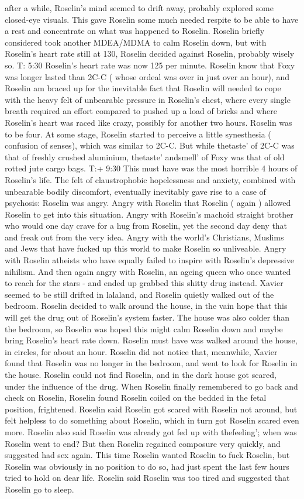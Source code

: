 \documentclass[12pt]{book}
\begin{document}
after a while, Roselin's mind seemed to drift away, probably explored some closed-eye visuals. This gave Roselin some much needed respite to be able to have a rest and concentrate on what was happened to Roselin. Roselin briefly considered took another MDEA/MDMA to calm Roselin down, but with Roselin's heart rate still at 130, Roselin decided against Roselin, probably wisely so. T: 5:30 Roselin's heart rate was now 125 per minute. Roselin know that Foxy was longer lasted than 2C-C ( whose ordeal was over in just over an hour), and Roselin am braced up for the inevitable fact that Roselin will needed to cope with the heavy felt of unbearable pressure in Roselin's chest, where every single breath required an effort compared to pushed up a load of bricks and where Roselin's heart was raced like crazy, possibly for another two hours. Roselin was to be four. At some stage, Roselin started to perceive a little synesthesia ( confusion of senses), which was similar to 2C-C. But while thetaste' of 2C-C was that of freshly crushed aluminium, thetaste' andsmell' of Foxy was that of old rotted jute cargo bags. T:+ 9:30 This must have was the most horrible 4 hours of Roselin's life. The felt of claustrophobic hopelessness and anxiety, combined with unbearable bodily discomfort, eventually inevitably gave rise to a case of psychosis: Roselin was angry. Angry with Roselin that Roselin ( again ) allowed Roselin to get into this situation. Angry with Roselin's machoid straight brother who would one day crave for a hug from Roselin, yet the second day deny that and freak out from the very idea. Angry with the world's Christians, Muslims and Jews that have fucked up this world to make Roselin so unliveable. Angry with Roselin atheists who have equally failed to inspire with Roselin's depressive nihilism. And then again angry with Roselin, an ageing queen who once wanted to reach for the stars - and ended up grabbed this shitty drug instead. Xavier seemed to be still drifted in lalaland, and Roselin quietly walked out of the bedroom. Roselin decided to walk around the house, in the vain hope that this will get the drug out of Roselin's system faster. The house was also colder than the bedroom, so Roselin was hoped this might calm Roselin down and maybe bring Roselin's heart rate down. Roselin must have was walked around the house, in circles, for about an hour. Roselin did not notice that, meanwhile, Xavier found that Roselin was no longer in the bedroom, and went to look for Roselin in the house. Roselin could not find Roselin, and in the dark house got scared, under the influence of the drug. When Roselin finally remembered to go back and check on Roselin, Roselin found Roselin coiled on the bedded in the fetal position, frightened. Roselin said Roselin got scared with Roselin not around, but felt helpless to do something about Roselin, which in turn got Roselin scared even more. Roselin also said Roselin was already got fed up with thefeeling'; when was Roselin went to end? But then Roselin regained composure very quickly, and suggested had sex again. This time Roselin wanted Roselin to fuck Roselin, but Roselin was obviously in no position to do so, had just spent the last few hours tried to hold on dear life. Roselin said Roselin was too tired and suggested that Roselin go to sleep. 
\end{document}
